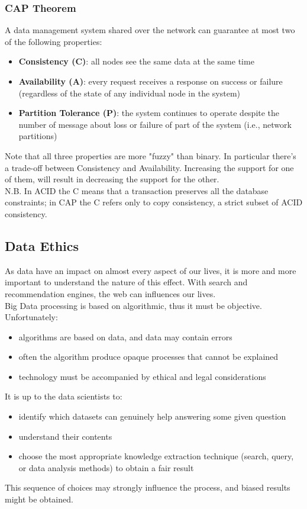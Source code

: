 \documentclass[10pt,a4paper]{article}
\begin{document}
\begin{justify}
\subsubsection{CAP Theorem}
A data management system shared over the network can guarantee at most two of the following properties:
\begin{itemize}
	\item \textbf{Consistency (C)}: all nodes see the same data at the same time
	\item \textbf{Availability (A)}: every request receives a response on success or failure (regardless of the
state of any individual node in the system)
	\item \textbf{Partition Tolerance (P)}: the system continues to operate despite the number of message about loss or failure of part of the system (i.e., network partitions)
\end{itemize}
Note that all three properties are more "fuzzy" than binary. In particular there's a trade-off between Consistency and Availability. Increasing the support for one of them, will result in decreasing the support for the other. \\
N.B. In ACID the C means that a transaction preserves all the database constraints; in CAP the C refers only to copy consistency, a strict subset of ACID consistency.
\pagebreak
\subsection{Data Ethics}
As data have an impact on almost every aspect of our lives, it is more and more important to understand the nature of this effect. With search and recommendation engines, the web can influences our lives. \\
Big Data processing is based on algorithmic, thus it must be objective. Unfortunately:
\begin{itemize}
	\item algorithms are based on data, and data may contain errors
	\item often the algorithm produce opaque processes that cannot be explained
	\item technology must be accompanied by ethical and legal considerations
\end{itemize}
It is up to the data scientists to:
\begin{itemize}
	\item identify which datasets can genuinely help answering some given question
	\item understand their contents
	\item choose the most appropriate knowledge extraction technique (search, query, or data analysis methods) to obtain a fair result
\end{itemize}
This sequence of choices may strongly influence the process, and biased results might be obtained.

\end{justify}
\end{document}
